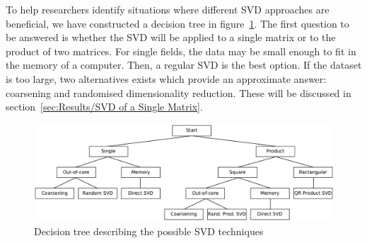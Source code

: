 \documentclass[ijgi,article,submit,moreauthors,pdftex,10pt,a4paper]{Definitions/mdpi}
\begin{document}
%
%


To help researchers identify situations where different SVD approaches are beneficial, we have constructed a decision tree in figure~\ref{fig:FlowDiagram}. The first question to be answered is whether the SVD will be applied to a single matrix or to the product of two matrices. For single fields, the data may be small enough to fit in the memory of a computer. Then, a regular SVD is the best option. If the dataset is too large, two alternatives exists which provide an approximate answer: coarsening and randomised dimensionality reduction. These will be discussed in section~\ref{sec:Results/SVD of a Single Matrix}.

\begin{figure}[H]
\centering
\includegraphics[width=\textwidth]{Results/FlowDiagram.pdf}
\caption{Decision tree describing the possible SVD techniques}
\label{fig:FlowDiagram}
\end{figure}
\end{document}
